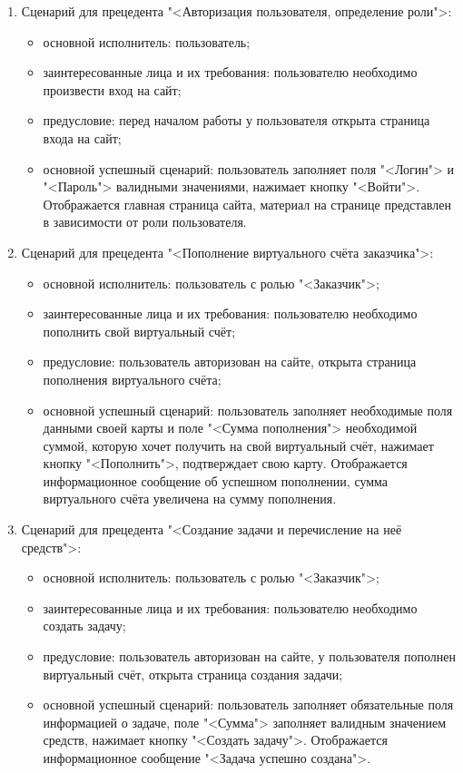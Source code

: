\begin{enumerate}
\item Сценарий для прецедента "<Авторизация пользователя, определение роли">:
	\begin{itemize}
		\item основной исполнитель: пользователь;
		\item заинтересованные лица и их требования: пользователю необходимо произвести вход на сайт;
		\item предусловие: перед началом работы у пользователя открыта страница входа на сайт;
		\item основной успешный сценарий: пользователь заполняет поля "<Логин"> и "<Пароль"> валидными значениями, нажимает кнопку "<Войти">. Отображается главная страница сайта, материал на странице представлен в зависимости от роли пользователя.
	\end{itemize}
\item Сценарий для прецедента "<Пополнение виртуального счёта заказчика">:
	\begin{itemize}
		\item основной исполнитель: пользователь с ролью "<Заказчик">;
		\item заинтересованные лица и их требования: пользователю необходимо пополнить свой виртуальный счёт;
		\item предусловие: пользователь авторизован на сайте, открыта страница пополнения виртуального счёта;
		\item основной успешный сценарий: пользователь заполняет необходимые поля данными своей карты и поле "<Сумма пополнения"> необходимой суммой, которую хочет получить на свой виртуальный счёт, нажимает кнопку "<Пополнить">, подтверждает свою карту. Отображается информационное сообщение об успешном пополнении, сумма виртуального счёта увеличена на сумму пополнения.
	\end{itemize}
\item Сценарий для прецедента "<Создание задачи и перечисление на неё средств">:
	\begin{itemize}
		\item основной исполнитель: пользователь с ролью "<Заказчик">;
		\item заинтересованные лица и их требования: пользователю необходимо создать задачу;
		\item предусловие: пользователь авторизован на сайте, у пользователя пополнен виртуальный счёт, открыта страница создания задачи;
		\item основной успешный сценарий: пользователь заполняет обязательные поля информацией о задаче, поле "<Сумма"> заполняет валидным значением средств, нажимает кнопку "<Создать задачу">. Отображается информационное сообщение "<Задача успешно создана">.

\end{itemize}
\end{enumerate}
